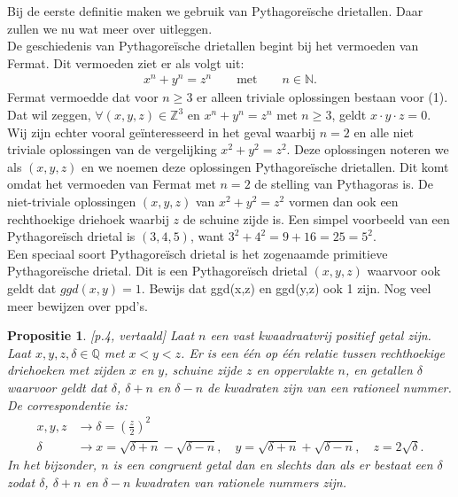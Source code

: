 \documentclass[12pt,reqno]{article}
\newcommand*{\NN}{\ensuremath{\mathbb{N}}}
\newcommand*{\ZZ}{\ensuremath{\mathbb{Z}}}
\newcommand*{\QQ}{\ensuremath{\mathbb{Q}}}
\theoremstyle{theorem}
\newtheorem{proposition}[theorem]{Propositie}
\theoremstyle{definition}
\begin{document}
	
	Bij de eerste definitie maken we gebruik van Pythagore\"ische drietallen. Daar zullen we nu wat meer over uitleggen.\\
	
	De geschiedenis van Pythagore\"ische drietallen begint bij het vermoeden van Fermat. Dit vermoeden ziet er als volgt uit:
	\begin{align}
	x^n + y^n = z^n \qquad \text{met} \qquad n \in \NN.
	\end{align}
	Fermat vermoedde dat voor $n \geq 3$ er alleen triviale oplossingen bestaan voor (1). Dat wil zeggen, $\forall (x,y,z) \in \ZZ^3$ en $x^n + y^n = z^n$ met $n \geq 3$, geldt $x \cdot y \cdot z = 0$. \\
	Wij zijn echter vooral ge\"interesseerd in het geval waarbij $n=2$ en alle niet triviale oplossingen van de vergelijking $x^2 + y^2 = z^2$. Deze oplossingen noteren we als $(x,y,z)$ en we noemen deze oplossingen Pythagore\"ische drietallen. Dit komt omdat het vermoeden van Fermat met $n=2$ de stelling van Pythagoras is. De niet-triviale oplossingen $(x,y,z)$ van $x^2 + y^2 = z^2$ vormen dan ook een rechthoekige driehoek waarbij $z$ de schuine zijde is. Een simpel voorbeeld van een Pythagore\"isch drietal is $(3,4,5)$, want $3^2 + 4^2 = 9 + 16 = 25 = 5^2$. \\
	Een speciaal soort Pythagore\"isch drietal is het zogenaamde primitieve Pythagore\"ische drietal. Dit is een Pythagore\"isch drietal $(x,y,z)$ waarvoor ook geldt dat $ggd(x,y)=1$.
	{\color{red}Bewijs dat ggd(x,z) en ggd(y,z) ook 1 zijn. Nog veel meer bewijzen over ppd's.}
	
	\begin{proposition}
		\cite{Koblitz}[p.4, vertaald] Laat $n$ een vast kwaadraatvrij positief getal zijn. Laat $x,y,z,\delta \in\QQ$ met $x<y<z$. Er is een \'e\'en op \'e\'en relatie tussen rechthoekige driehoeken met zijden $x$ en $y$, schuine zijde $z$ en oppervlakte $n$, en getallen $\delta$ waarvoor geldt dat $\delta$, $\delta +n$ en $\delta -n$ de kwadraten zijn van een rationeel nummer. De correspondentie is:
		\begin{align}
		x,y,z &\rightarrow \delta = \left( \frac{z}{2} \right)^2 \\
		\delta &\rightarrow x=\sqrt{\delta+n} - \sqrt{\delta-n},\quad y = \sqrt{\delta+n}+\sqrt{\delta-n},\quad z = 2\sqrt{\delta}.
		\end{align}
		In het bijzonder, $n$ is een congruent getal dan en slechts dan als er bestaat een $\delta$ zodat $\delta$, $\delta+n$ en $\delta-n$ kwadraten van rationele nummers zijn.
	\end{proposition}
	
\end{document}
